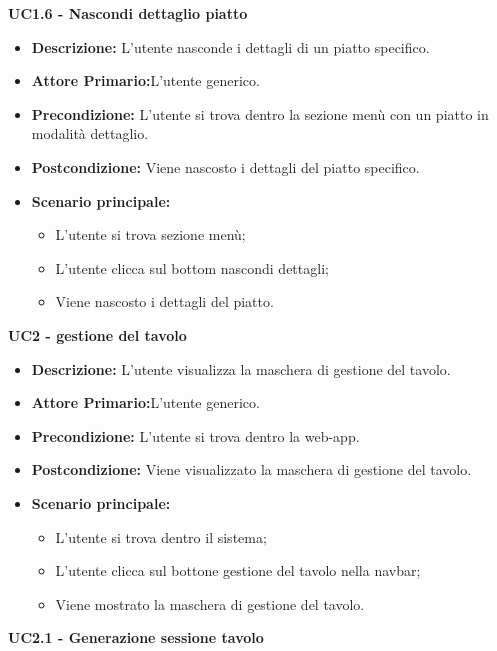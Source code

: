 \textbf{UC1.6 - Nascondi dettaglio piatto}
\begin{itemize}
    \item \textbf{Descrizione:} L'utente nasconde i dettagli di un piatto specifico.
    \item \textbf{Attore Primario:}L'utente generico.
    \item \textbf{Precondizione:} L'utente si trova dentro la sezione menù con un piatto in modalità dettaglio.
    \item \textbf{Postcondizione:} Viene nascosto i dettagli del piatto specifico.
    \item \textbf{Scenario principale:}  
    \begin{itemize}
        \item L'utente si trova sezione menù;
        \item L'utente clicca sul bottom nascondi dettagli;
        \item Viene nascosto i dettagli del piatto.
    \end{itemize}
\end{itemize}
\textbf{UC2 - gestione del tavolo}
\begin{itemize}
    \item \textbf{Descrizione:} L'utente visualizza la maschera di gestione del tavolo.
    \item \textbf{Attore Primario:}L'utente generico.
    \item \textbf{Precondizione:} L'utente si trova dentro la web-app.
    \item \textbf{Postcondizione:} Viene visualizzato la maschera di gestione del tavolo.
    \item \textbf{Scenario principale:}
    \begin{itemize}
        \item L'utente si trova dentro il sistema;
        \item L'utente clicca sul bottone gestione del tavolo nella navbar;
        \item Viene mostrato la maschera di gestione del tavolo.
    \end{itemize}
\end{itemize}
\textbf{UC2.1 - Generazione sessione tavolo}
